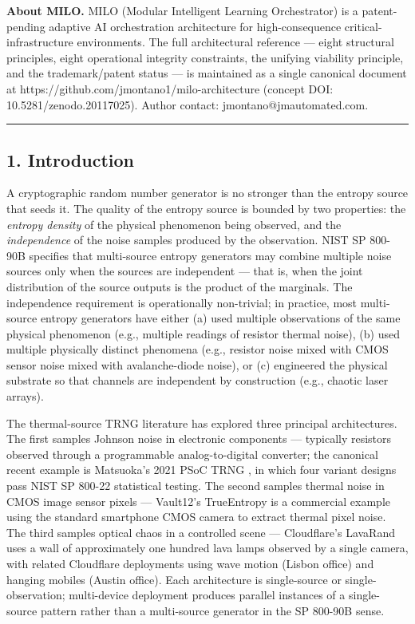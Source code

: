 \textbf{About MILO.} MILO (Modular Intelligent Learning Orchestrator) is
a patent-pending adaptive AI orchestration architecture for
high-consequence critical-infrastructure environments. The full
architectural reference --- eight structural principles, eight
operational integrity constraints, the unifying viability principle, and
the trademark/patent status --- is maintained as a single canonical
document at https://github.com/jmontano1/milo-architecture (concept DOI:
10.5281/zenodo.20117025). Author contact: jmontano@jmautomated.com.

\begin{center}\rule{0.5\linewidth}{0.5pt}\end{center}

\subsection{1. Introduction}\label{introduction}

A cryptographic random number generator is no stronger than the entropy
source that seeds it. The quality of the entropy source is bounded by
two properties: the \emph{entropy density} of the physical phenomenon
being observed, and the \emph{independence} of the noise samples
produced by the observation. NIST SP 800-90B \cite{ref1} specifies that
multi-source entropy generators may combine multiple noise sources only
when the sources are independent --- that is, when the joint
distribution of the source outputs is the product of the marginals. The
independence requirement is operationally non-trivial; in practice, most
multi-source entropy generators have either (a) used multiple
observations of the same physical phenomenon (e.g., multiple readings of
resistor thermal noise), (b) used multiple physically distinct phenomena
(e.g., resistor noise mixed with CMOS sensor noise mixed with
avalanche-diode noise), or (c) engineered the physical substrate so that
channels are independent by construction (e.g., chaotic laser arrays).

The thermal-source TRNG literature has explored three principal
architectures. The first samples Johnson noise in electronic components
--- typically resistors observed through a programmable
analog-to-digital converter; the canonical recent example is Matsuoka's
2021 PSoC TRNG \cite{ref2}, in which four variant designs pass NIST SP
800-22 statistical testing. The second samples thermal noise in CMOS
image sensor pixels --- Vault12's TrueEntropy \cite{ref3} is a commercial
example using the standard smartphone CMOS camera to extract thermal
pixel noise. The third samples optical chaos in a controlled scene ---
Cloudflare's LavaRand \cite{ref4} uses a wall of approximately one hundred
lava lamps observed by a single camera, with related Cloudflare
deployments using wave motion (Lisbon office) and hanging mobiles
(Austin office). Each architecture is single-source or
single-observation; multi-device deployment produces parallel instances
of a single-source pattern rather than a multi-source generator in the
SP 800-90B sense.

